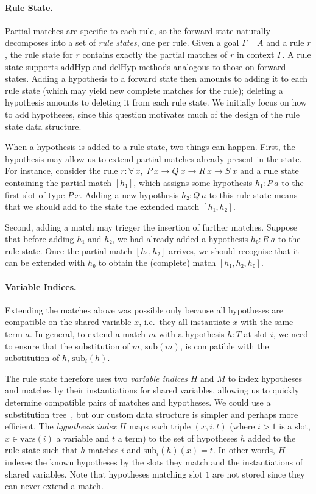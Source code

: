 \documentclass[runningheads]{llncs}
\newcommand{\All}[2]{\ensuremath{\forall\, #1,\; #2}}
\newcommand{\vars}{\ensuremath{\mathrm{vars}}}
\newcommand{\sub}{\ensuremath{\mathrm{sub}}}
\newcommand{\addHyp}{\ensuremath{\mathrm{addHyp}}}
\newcommand{\delHyp}{\ensuremath{\mathrm{delHyp}}}
\begin{document}
\paragraph{Rule State.}
Partial matches are specific to each rule, so the forward state naturally decomposes into a set of \emph{rule states}, one per rule.
Given a goal $Γ ⊢ A$ and a rule $r$, the rule state for $r$ contains exactly the partial matches of $r$ in context $Γ$.
A rule state supports $\addHyp$ and $\delHyp$ methods analogous to those on forward states.
Adding a hypothesis to a forward state then amounts to adding it to each rule state (which may yield new complete matches for the rule); deleting a hypothesis amounts to deleting it from each rule state.
We initially focus on how to add hypotheses, since this question motivates much of the design of the rule state data structure.

When a hypothesis is added to a rule state, two things can happen.
First, the hypothesis may allow us to extend partial matches already present in the state.
For instance, consider the rule $r : \All{x}{P~x → Q~x → R~x → S~x}$ and a rule state containing the partial match $[h₁]$, which assigns some hypothesis $h₁ : P~a$ to the first slot of type $P~x$.
Adding a new hypothesis $h₂ : Q~a$ to this rule state means that we should add to the state the extended match $[h₁, h₂]$.

Second, adding a match may trigger the insertion of further matches.
Suppose that before adding $h₁$ and $h₂$, we had already added a hypothesis $h₀ : R~a$ to the rule state.
Once the partial match $[h₁, h₂]$ arrives, we should recognise that it can be extended with $h₀$ to obtain the (complete) match $[h₁, h₂, h₀]$.

\paragraph{Variable Indices.}
Extending the matches above was possible only because all hypotheses are compatible on the shared variable $x$, i.e.\ they all instantiate $x$ with the same term $a$.
In general, to extend a match $m$ with a hypothesis $h : T$ at slot $i$, we need to ensure that the substitution of $m$, $\sub(m)$, is compatible with the substitution of $h$, $\sub_{i}(h)$.

The rule state therefore uses two \emph{variable indices} $H$ and $M$ to index hypotheses and matches by their instantiations for shared variables, allowing us to quickly determine compatible pairs of matches and hypotheses.
We could use a substitution tree~\cite{SubstitutionTrees}, but our custom data structure is simpler and perhaps more efficient.
The \emph{hypothesis index} $H$ maps each triple $(x, i, t)$ (where $i > 1$ is a slot, $x ∈ \vars(i)$ a variable and $t$ a term) to the set of hypotheses $h$ added to the rule state such that $h$ matches $i$ and $\sub_{i}(h)(x) = t$.
In other words, $H$ indexes the known hypotheses by the slots they match and the instantiations of shared variables.
Note that hypotheses matching slot $1$ are not stored since they can never extend a match.
\end{document}
